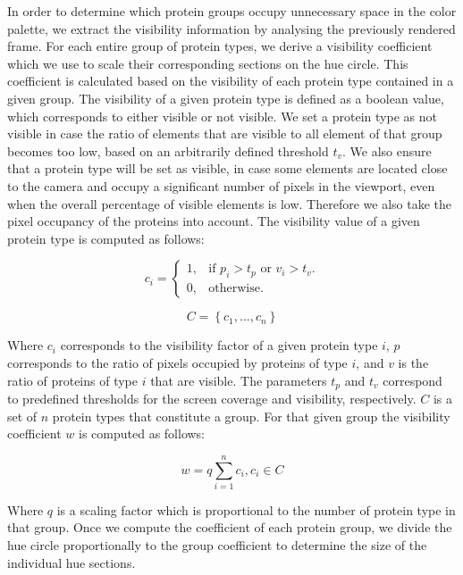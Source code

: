 \documentclass[review,journal]{vgtc}         %
\begin{document}
	In order to determine which protein groups occupy unnecessary space in the color palette, we extract the visibility information by analysing the previously rendered frame.
	For each entire group of protein types, we derive a visibility coefficient which we use to scale their corresponding sections on the hue circle. 
	This coefficient is calculated based on the visibility of each protein type contained in a given group.
	The visibility of a given protein type is defined as a boolean value, which corresponds to either visible or not visible.
	We set a protein type as not visible in case the ratio of elements that are visible to all element of that group becomes too low, based on an arbitrarily defined threshold $t_v$.
	We also ensure that a protein type will be set as visible, in case some elements are located close to the camera and occupy a significant number of pixels in the viewport, even when the overall percentage of visible elements is low.
	Therefore we also take the pixel occupancy of the proteins into account.
	The visibility value of a given protein type is computed as follows:
	
	\begin{equation}
	c_{i}=\begin{cases}
	1, & \text{if $p_{i}>t_{p}$ or $v_{i}>t_{v}$}.\\
	0, & \text{otherwise}.
	\end{cases}
	\end{equation}
	
	\begin{equation}
	C = \left\lbrace c_{1}, ... , c_{n} \right\rbrace 
	\end{equation}
	
	Where $c_i$ corresponds to the visibility factor of a given protein type $i$, $p$ corresponds to the ratio of pixels occupied by proteins of type $i$, and $v$ is the ratio of proteins of type $i$ that are visible.
	The parameters $t_{p}$ and $t_{v}$ correspond to predefined thresholds for the screen coverage and visibility, respectively. 
	$C$ is a set of $n$ protein types that constitute a group.
	For that given group the visibility coefficient $w$ is computed as follows:
	
	\begin{equation}
	w = q\sum_{i=1}^{n} c_{i}, c_{i} \in C
	\end{equation}
	
	Where $q$ is a scaling factor which is proportional to the number of protein type in that group. 
	Once we compute the coefficient of each protein group, we divide the hue circle proportionally to the group coefficient to determine the size of the individual hue sections. \\
	
\end{document}
